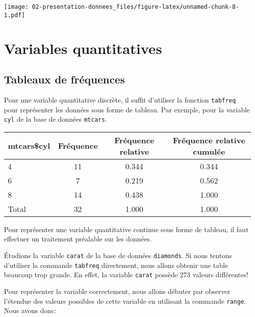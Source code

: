 \documentclass[]{book}
\newenvironment{Shaded}{\begin{snugshade}}{\end{snugshade}}
\newcommand{\KeywordTok}[1]{\textcolor[rgb]{0.13,0.29,0.53}{\textbf{#1}}}
\newcommand{\OperatorTok}[1]{\textcolor[rgb]{0.81,0.36,0.00}{\textbf{#1}}}
\newcommand{\NormalTok}[1]{#1}
\begin{document}
\texttt{[image: 02-presentation-donnees\_files/figure-latex/unnamed-chunk-8-1.pdf]}

\section{Variables quantitatives}\label{variables-quantitatives-1}

\subsection{Tableaux de fréquences}\label{freqquantitatives}

Pour une variable quantitative discrète, il suffit d'utiliser la
fonction \texttt{tabfreq} pour représenter les données sous forme de
tableau. Par exemple, pour la variable \texttt{cyl} de la base de
données \texttt{mtcars}.

\begin{Shaded}
\end{Shaded}

\begin{tabular}{l|c|c|c}
\hline
mtcars\$cyl & Fréquence & Fréquence relative & Fréquence relative cumulée\\
\hline
4 & 11 & 0.344 & 0.344\\
\hline
6 & 7 & 0.219 & 0.562\\
\hline
8 & 14 & 0.438 & 1.000\\
\hline
Total & 32 & 1.000 & 1.000\\
\hline
\end{tabular}

Pour représenter une variable quantitative continue sous forme de
tableau, il faut effectuer un traitement préalable sur les données.

Étudions la variable \texttt{carat} de la base de données
\texttt{diamonds}. Si nous tentons d'utiliser la commande
\texttt{tabfreq} directement, nous allons obtenir une table beaucoup
trop grande. En effet, la variable \texttt{carat} possède 273 valeurs
différentes!

Pour représenter la variable correctement, nous allons débuter par
observer l'étendue des valeurs possibles de cette variable en utilisant
la commande \texttt{range}. Nous avons donc:

\begin{Shaded}
\end{Shaded}
\end{document}
